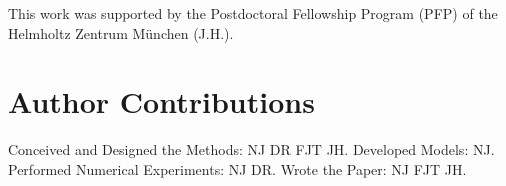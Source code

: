 \documentclass[10pt,letterpaper]{article}
\begin{document}

This work was supported by the Postdoctoral Fellowship Program (PFP) of the Helmholtz Zentrum M\"unchen (J.H.).

\section*{Author Contributions}

Conceived and Designed the Methods: NJ DR FJT JH.
Developed Models: NJ.
Performed Numerical Experiments: NJ DR.
Wrote the Paper: NJ FJT JH.

\nolinenumbers


\end{document}

